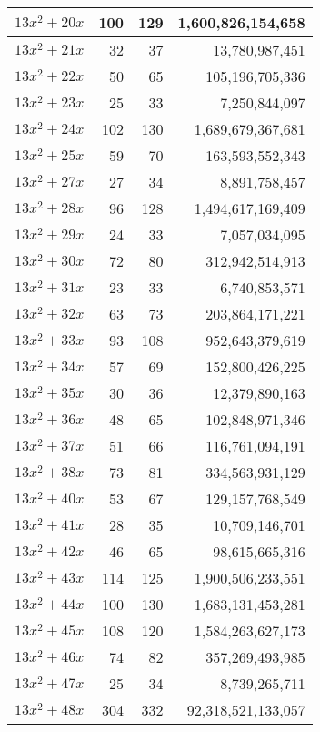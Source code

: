 \documentclass[a4paper]{amsproc}
\theoremstyle{plain}
\theoremstyle{named}
\begin{document}
\begin{longtable}{ | l | r | r | r | }
$13x^2 + 20x$ & 100 & 129 & 1{,}600{,}826{,}154{,}658 \\ \hline
$13x^2 + 21x$ & 32 & 37 & 13{,}780{,}987{,}451 \\ \hline
$13x^2 + 22x$ & 50 & 65 & 105{,}196{,}705{,}336 \\ \hline
$13x^2 + 23x$ & 25 & 33 & 7{,}250{,}844{,}097 \\ \hline
$13x^2 + 24x$ & 102 & 130 & 1{,}689{,}679{,}367{,}681 \\ \hline
$13x^2 + 25x$ & 59 & 70 & 163{,}593{,}552{,}343 \\ \hline
$13x^2 + 27x$ & 27 & 34 & 8{,}891{,}758{,}457 \\ \hline
$13x^2 + 28x$ & 96 & 128 & 1{,}494{,}617{,}169{,}409 \\ \hline
$13x^2 + 29x$ & 24 & 33 & 7{,}057{,}034{,}095 \\ \hline
$13x^2 + 30x$ & 72 & 80 & 312{,}942{,}514{,}913 \\ \hline
$13x^2 + 31x$ & 23 & 33 & 6{,}740{,}853{,}571 \\ \hline
$13x^2 + 32x$ & 63 & 73 & 203{,}864{,}171{,}221 \\ \hline
$13x^2 + 33x$ & 93 & 108 & 952{,}643{,}379{,}619 \\ \hline
$13x^2 + 34x$ & 57 & 69 & 152{,}800{,}426{,}225 \\ \hline
$13x^2 + 35x$ & 30 & 36 & 12{,}379{,}890{,}163 \\ \hline
$13x^2 + 36x$ & 48 & 65 & 102{,}848{,}971{,}346 \\ \hline
$13x^2 + 37x$ & 51 & 66 & 116{,}761{,}094{,}191 \\ \hline
$13x^2 + 38x$ & 73 & 81 & 334{,}563{,}931{,}129 \\ \hline
$13x^2 + 40x$ & 53 & 67 & 129{,}157{,}768{,}549 \\ \hline
$13x^2 + 41x$ & 28 & 35 & 10{,}709{,}146{,}701 \\ \hline
$13x^2 + 42x$ & 46 & 65 & 98{,}615{,}665{,}316 \\ \hline
$13x^2 + 43x$ & 114 & 125 & 1{,}900{,}506{,}233{,}551 \\ \hline
$13x^2 + 44x$ & 100 & 130 & 1{,}683{,}131{,}453{,}281 \\ \hline
$13x^2 + 45x$ & 108 & 120 & 1{,}584{,}263{,}627{,}173 \\ \hline
$13x^2 + 46x$ & 74 & 82 & 357{,}269{,}493{,}985 \\ \hline
$13x^2 + 47x$ & 25 & 34 & 8{,}739{,}265{,}711 \\ \hline
$13x^2 + 48x$ & 304 & 332 & 92{,}318{,}521{,}133{,}057 \\ \hline

\end{longtable}
\end{document}
